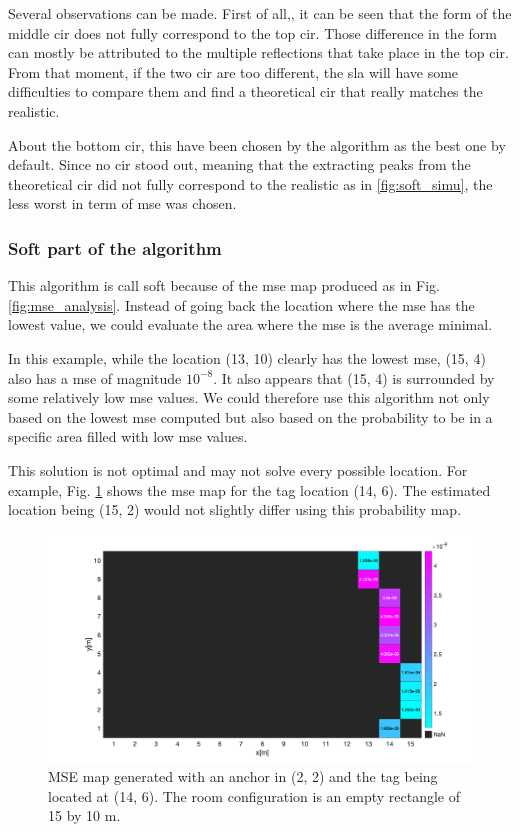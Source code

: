 Several observations can be made. First of all,, it can be seen that the form of the middle \gls{cir} does not fully correspond to the top \gls{cir}. Those difference in the form can mostly be attributed to the multiple reflections that take place in the top \gls{cir}. From that moment, if the two \gls{cir} are too different, the \gls{sla} will have some difficulties to compare them and find a theoretical \gls{cir} that really matches the realistic.
\vspace{2mm}

About the bottom \gls{cir}, this have been chosen by the algorithm as the best one by default. Since no \gls{cir} stood out, meaning that the extracting peaks from the theoretical \gls{cir} did not fully correspond to the realistic as in \ref{fig:soft_simu}, the less worst in term of \gls{mse} was chosen.
\vspace{2mm}

\subsubsection{Soft part of the algorithm}

This algorithm is call soft because of the \gls{mse} map produced as in Fig. \ref{fig:mse_analysis}. Instead of going back the location where the \gls{mse} has the lowest value, we could evaluate the area where the \gls{mse} is the average minimal.
\vspace{2mm}

In this example, while the location (13, 10) clearly has the lowest \gls{mse}, (15, 4) also has a \gls{mse} of magnitude $10^{-8}$. It also appears that (15, 4) is surrounded by some relatively low \gls{mse} values. We could therefore use this algorithm not only based on the lowest \gls{mse} computed but also based on the probability to be in a specific area filled with low \gls{mse} values.
\vspace{2mm}

This solution is not optimal and may not solve every possible location. For example, Fig. \ref{fig:again_an_image} shows the \gls{mse} map for the tag location (14, 6). The estimated location being (15, 2) would not slightly differ using this probability map.

\begin{figure}[H]
\centering
\includegraphics[width=.9\linewidth]{Images/image_XXX.png}
\caption{MSE map generated with an anchor in (2, 2) and the tag being located at (14, 6). The room configuration is an empty rectangle of 15 by 10 m. \label{fig:again_an_image}}
\end{figure}

